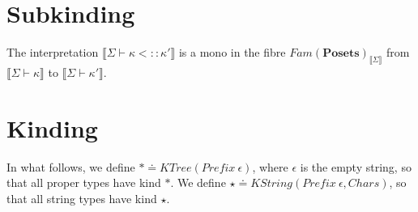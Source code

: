 \documentclass{article}
\newcommand{\mbf}{\mathbf}
\newcommand{\sem}[1]{\llbracket #1 \rrbracket}
\begin{document}
\section*{Subkinding}

The interpretation $\sem{\Sigma \vdash \kappa <:: \kappa'}$ is a mono in the fibre $\mathit{Fam}(\mbf{Posets})_{\sem{\Sigma}}$ from $\sem{\Sigma \vdash \kappa}$ to $\sem{\Sigma \vdash \kappa'}$.


\section*{Kinding}

In what follows, we define $\ast \doteq \mathit{KTree}(\mathit{Prefix}~\epsilon)$, where $\epsilon$ is the empty string, so that all proper types have kind $\ast$. We define $\star \doteq \mathit{KString}(\mathit{Prefix}~\epsilon, \mathit{Chars})$, so that all string types have kind $\star$.
\end{document}
